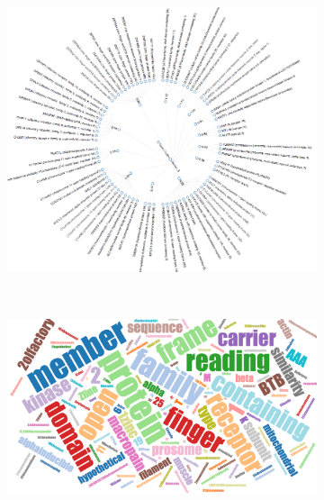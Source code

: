 \documentclass[aps,prd,final,onecolumn,a4paper,10pt]{revtex4}
\begin{document}
\begin{figure}[H]
  \centering
  \begin{subfigure}[b]{0.5\textwidth}
    \includegraphics[width=.9\textwidth]{dendrogram.png}
    \label{fig:dendrogram}
  \end{subfigure}%
  ~ %
  \begin{subfigure}[b]{0.5\textwidth}
    \includegraphics[width=.9\textwidth]{wordcloud.png}
    \label{fig:wordcloud}
  \end{subfigure}%
  \label{fig:enrichment}


\end{figure}
\end{document}
